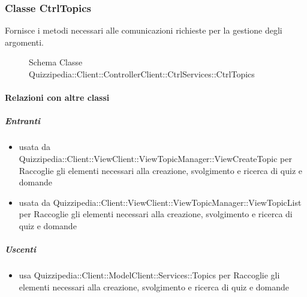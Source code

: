 \subsubsection{Classe CtrlTopics}
Fornisce i metodi necessari alle comunicazioni richieste per la gestione degli argomenti.
\begin{figure}[H]
\centering
\noindent{}
\caption[Schema Classe CtrlTopics]{Schema Classe Quizzipedia::Client::ControllerClient::CtrlServices::CtrlTopics}
\end{figure}
\paragraph{Relazioni con altre classi}
\subparagraph{Entranti}
\begin{itemize}
\item usata da Quizzipedia::Client::ViewClient::ViewTopicManager::ViewCreateTopic per Raccoglie gli elementi necessari alla creazione, svolgimento e ricerca di quiz e domande
\item usata da Quizzipedia::Client::ViewClient::ViewTopicManager::ViewTopicList per Raccoglie gli elementi necessari alla creazione, svolgimento e ricerca di quiz e domande
\end{itemize}
\subparagraph{Uscenti}
\begin{itemize}
\item usa Quizzipedia::Client::ModelClient::Services::Topics per Raccoglie gli elementi necessari alla creazione, svolgimento e ricerca di quiz e domande
\end{itemize}
